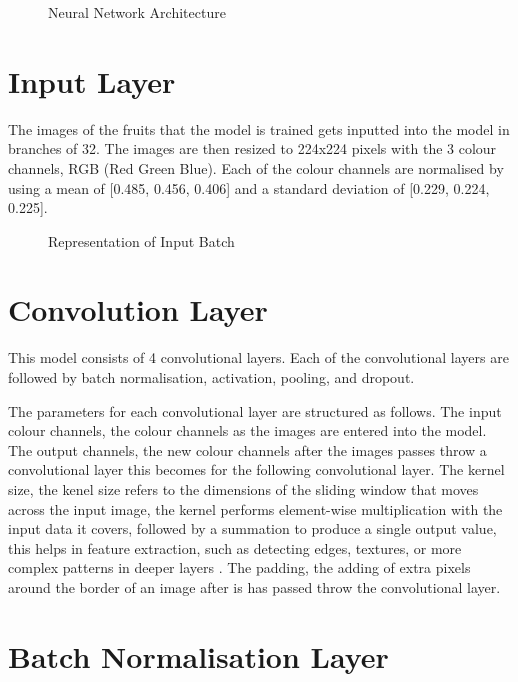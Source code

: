 \documentclass[a4paper,oneside,11pt]{book}
\begin{document}
\begin{figure}[h]
    \centering
    \caption{Neural Network Architecture}
\end{figure}

\newpage
\section{Input Layer}

The images of the fruits that the model is trained gets inputted into the model in branches of 32. The images are then resized to 224x224 pixels with the 3 colour channels, RGB (Red Green Blue). Each of the colour channels are normalised by using a mean of [0.485, 0.456, 0.406] and a standard deviation of [0.229, 0.224, 0.225]. 

\begin{figure}[h]
    \centering
    \caption{Representation of Input Batch}
\end{figure}

\section{Convolution Layer}

This model consists of 4 convolutional layers. Each of the convolutional layers are followed by batch normalisation, activation, pooling, and dropout.

The parameters for each convolutional layer are structured as follows. The input colour channels, the colour channels as the images are entered into the model. The output channels, the new colour channels after the images passes throw a convolutional layer this becomes for the following convolutional layer. The kernel size, the kenel size refers to the dimensions of the sliding window that moves across the input image, the kernel performs element-wise multiplication with the input data it covers, followed by a summation to produce a single output value, this helps in feature extraction, such as detecting edges, textures, or more complex patterns in deeper layers \citep{ding2022scaling}. The padding, the adding of extra pixels around the border of an image after is has passed throw the convolutional layer.

\section{Batch Normalisation Layer}
\end{document}
